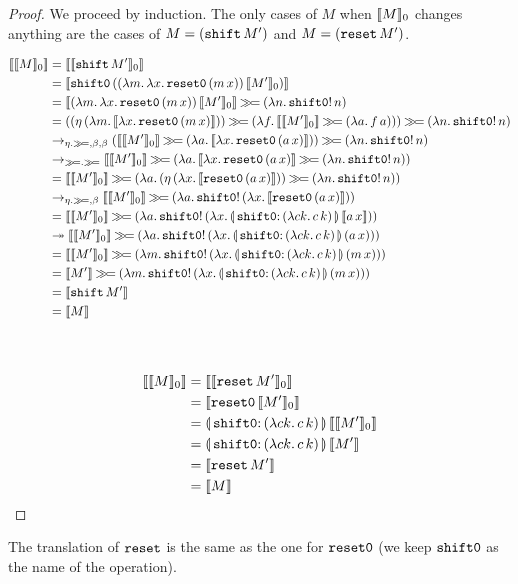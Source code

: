 \begin{proof}
  We proceed by induction. The only cases of $M$ when $\llbracket M \rrbracket_0$ changes
  anything are the cases of $M = (\mathtt{shift}\,M')$ and $M =
  (\mathtt{reset}\,M')$.

\begin{align}
\sem{\semo{M}}
&= \sem{\semo{\ap{\shift}{M'}}} \\
&= \sem{\ap{\shifto}{(\ap{(\lam{m}{\lam{x}{\ap{\reseto}{(\ap{m}{x})}}})}{\semo{M'}})}} \\
&= \sem{\ap{(\lam{m}{\lam{x}{\ap{\reseto}{(\ap{m}{x})}}})}{\semo{M'}}} \hsbind (\lam{n}{\ap{\op{shift0}!}{n}}) \\
&= ((\ap{\eta}{(\lam{m}{\sem{\lam{x}{\ap{\reseto}{(\ap{m}{x})}}}})}) \hsbind (\lam{f}{\sem{\semo{M'}} \hsbind (\lam{a}{\ap{f}{a}})})) \hsbind (\lam{n}{\ap{\op{shift0}!}{n}}) \\
&\to_{\eta.\hsbind,\beta,\beta} (\sem{\semo{M'}} \hsbind (\lam{a}{\sem{\lam{x}{\ap{\reseto}{(\ap{a}{x})}}}})) \hsbind (\lam{n}{\ap{\op{shift0}!}{n}}) \\
&\to_{\hsbind.\hsbind} \sem{\semo{M'}} \hsbind (\lam{a}{\sem{\lam{x}{\ap{\reseto}{(\ap{a}{x})}}} \hsbind (\lam{n}{\ap{\op{shift0}!}{n}})}) \\
&= \sem{\semo{M'}} \hsbind (\lam{a}{(\ap{\eta}{(\lam{x}{\sem{\ap{\reseto}{(\ap{a}{x})}}})}) \hsbind (\lam{n}{\ap{\op{shift0}!}{n}})}) \\
&\to_{\eta.\hsbind,\beta} \sem{\semo{M'}} \hsbind (\lam{a}{\ap{\op{shift0}!}{(\lam{x}{\sem{\ap{\reseto}{(\ap{a}{x})}}})}}) \\
&= \sem{\semo{M'}} \hsbind (\lam{a}{\ap{\op{shift0}!}{(\lam{x}{\ap{\resetobanana}{\sem{\ap{a}{x}}}})}}) \\
&\tto \sem{\semo{M'}} \hsbind (\lam{a}{\ap{\op{shift0}!}{(\lam{x}{\ap{\resetobanana}{(\ap{a}{x})}})}}) \\
&= \sem{\semo{M'}} \hsbind (\lam{m}{\ap{\op{shift0}!}{(\lam{x}{\ap{\resetobanana}{(\ap{m}{x})}})}}) \\
&= \sem{M'} \hsbind (\lam{m}{\ap{\op{shift0}!}{(\lam{x}{\ap{\resetobanana}{(\ap{m}{x})}})}}) \\
&= \sem{\ap{\shift}{M'}} \\
&= \sem{M} \\ \\
\setcounter{equation}{0}
\end{align}

\begin{align}
\sem{\semo{M}}
&= \sem{\semo{\ap{\reset}{M'}}} \\
&= \sem{\ap{\reseto}{\semo{M'}}} \\
&= \ap{\resetobanana}{\sem{\semo{M'}}} \\
&= \ap{\resetobanana}{\sem{M'}} \\
&= \sem{\ap{\reset}{M'}} \\
&= \sem{M}
\end{align}
\setcounter{equation}{0}
\end{proof}
The translation of $\mathtt{reset}$ is the same as the one for $\mathtt{reset0}$ (we keep
$\mathtt{shift0}$ as the name of the operation). 


